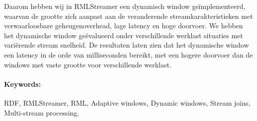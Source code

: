 Daarom hebben wij in RMLStreamer een dynamisch window geïmplementeerd, 
waarvan de grootte zich aanpast aan de veranderende streamkarakteristieken met 
verwaarloosbare geheugenoverhead, lage latency en hoge doorvoer.
We hebben het dynamische window geëvalueerd onder verschillende werklast situaties 
met variërende stream snelheid.
De resultaten laten zien dat het dynamische window een latency  in de orde van milliseconden bereikt, 
met een hogere doorvoer dan de windows met vaste grootte voor verschillende werklast.

\paragraph{Keywords:}

RDF, RMLStreamer, RML, Adaptive windows, Dynamic windows,
Stream joins, Multi-stream processing.

